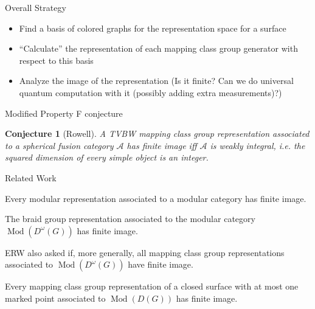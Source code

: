 \documentclass{beamer}
\DeclareMathOperator{\Mod}{Mod}
\newtheorem{conj}[theorem]{Conjecture}
\begin{document}
\begin{frame}{Overall Strategy}
\begin{itemize}
\item Find a basis of colored graphs for the representation space for a surface
\item ``Calculate'' the representation of each mapping class group generator with respect to this basis
\item Analyze the image of the representation (Is it finite? Can we do universal quantum computation with it (possibly adding extra measurements)?)
\end{itemize}
\end{frame}

\begin{frame}{Modified Property F conjecture}
\begin{conj}[Rowell]
A TVBW mapping class group representation associated to a spherical fusion category $\mathcal A$ has finite image iff $\mathcal A$ is weakly integral, i.e. the squared dimension of every simple object is an integer.
\end{conj}
\end{frame}

\begin{frame}{Related Work}


\begin{theorem}[Ng--Schauenberg]
Every modular representation associated to a modular category has finite image.
\end{theorem}

\pause


\begin{theorem}
The braid group representation associated to 
the modular category $\Mod(D^\omega(G))$ has finite image.
\end{theorem}

\pause


 ERW also asked if, more generally, all mapping class group representations associated to $\Mod(D^\omega(G))$ have finite image.  

\pause

\begin{theorem}
Every mapping class group representation of a closed surface with at most one marked point associated to $\Mod(D(G))$ has finite image.
\end{theorem}

\end{frame}
\end{document}
